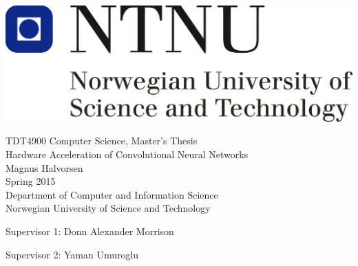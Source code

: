 \thispagestyle{empty}
\includegraphics[scale=0.3]{Figures/ntnu}
\mbox{}\\[6pc]
\begin{center}
\Large{TDT4900 Computer Science, Master's Thesis}\\[1pc]
\Huge{Hardware Acceleration of Convolutional Neural Networks}\\[2pc]

\Large{Magnus Halvorsen}\\[1pc]
\large{Spring 2015}\\[2pc]


Department of Computer and Information Science\\
Norwegian University of Science and Technology
\end{center}
\vfill

\noindent Supervisor 1: Donn Alexander Morrison

\noindent Supervisor 2: Yaman Umuroglu